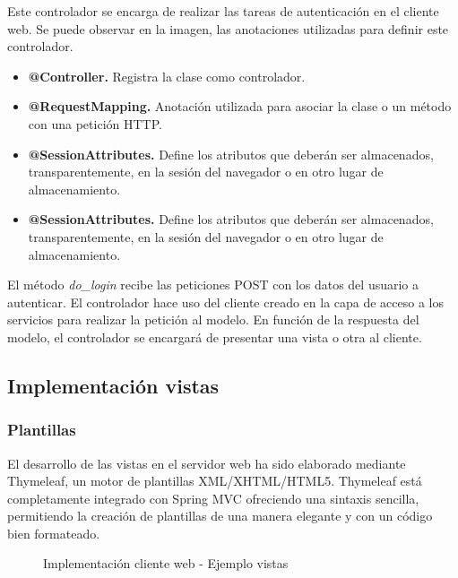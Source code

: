 Este controlador se encarga de realizar las tareas de autenticación en el cliente web. Se puede observar en la imagen, las anotaciones utilizadas para definir este controlador.

\begin{itemize}
	\item \textbf{@Controller. }Registra la clase como controlador.
	\item \textbf{@RequestMapping. }Anotación utilizada para asociar la clase o un método con una petición HTTP.
	\item \textbf{@SessionAttributes. }Define los atributos que deberán ser almacenados, transparentemente, en la sesión del navegador o en otro lugar de almacenamiento.
	\item \textbf{@SessionAttributes. }Define los atributos que deberán ser almacenados, transparentemente, en la sesión del navegador o en otro lugar de almacenamiento.
\end{itemize}

El método \textit{do\_login} recibe las peticiones POST con los datos del usuario a autenticar. El controlador hace uso del cliente creado en la capa de acceso a los servicios para realizar la petición al modelo. En función de la respuesta del modelo, el controlador se encargará de presentar una vista o otra al cliente.


\subsection{Implementación vistas}

\subsubsection*{Plantillas}

El desarrollo de las vistas en el servidor web ha sido elaborado mediante Thymeleaf, un motor de plantillas XML/XHTML/HTML5. Thymeleaf está completamente integrado con Spring MVC ofreciendo una sintaxis sencilla, permitiendo  la creación de plantillas de una manera elegante y con un código bien formateado.

\begin{figure}[H]
\centering
{}
\caption{Implementación cliente web - Ejemplo vistas}
\end{figure}

